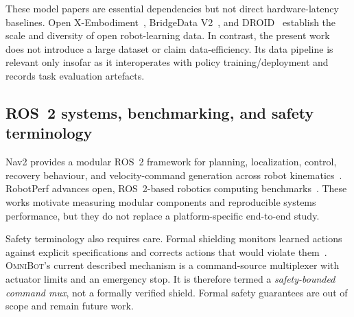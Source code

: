 \documentclass[letterpaper,10pt,conference]{ieeeconf}
\newcommand{\OmniBot}{\textsc{OmniBot}}
\begin{document}
These model papers are essential dependencies but not direct hardware-latency baselines. Open X-Embodiment~\cite{openx2024}, BridgeData V2~\cite{walke2023bridgedatav2}, and DROID~\cite{khazatsky2024droid} establish the scale and diversity of open robot-learning data. In contrast, the present work does not introduce a large dataset or claim data-efficiency. Its data pipeline is relevant only insofar as it interoperates with policy training/deployment and records task evaluation artefacts.

\subsection{ROS~2 systems, benchmarking, and safety terminology}

Nav2 provides a modular ROS~2 framework for planning, localization, control, recovery behaviour, and velocity-command generation across robot kinematics~\cite{macenski2023nav2}. RobotPerf advances open, ROS~2-based robotics computing benchmarks~\cite{robotperf2024}. These works motivate measuring modular components and reproducible systems performance, but they do not replace a platform-specific end-to-end study.

Safety terminology also requires care. Formal shielding monitors learned actions against explicit specifications and corrects actions that would violate them~\cite{alshiekh2018shielding}. \OmniBot's current described mechanism is a command-source multiplexer with actuator limits and an emergency stop. It is therefore termed a \emph{safety-bounded command mux}, not a formally verified shield. Formal safety guarantees are out of scope and remain future work.
\end{document}
